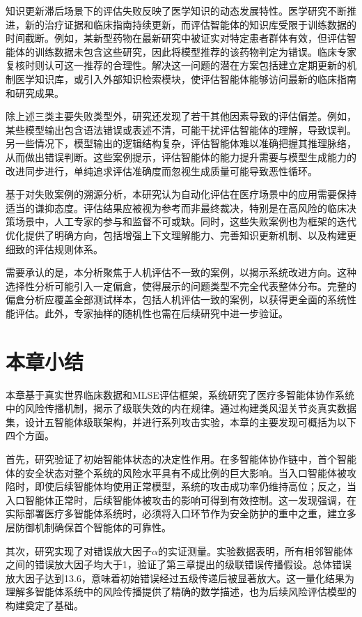 知识更新滞后场景下的评估失败反映了医学知识的动态发展特性。医学研究不断推进，新的治疗证据和临床指南持续更新，而评估智能体的知识库受限于训练数据的时间截断。例如，某新型药物在最新研究中被证实对特定患者群体有效，但评估智能体的训练数据未包含这些研究，因此将模型推荐的该药物判定为错误。临床专家复核时则认可这一推荐的合理性。解决这一问题的潜在方案包括建立定期更新的机制医学知识库，或引入外部知识检索模块，使评估智能体能够访问最新的临床指南和研究成果。

除上述三类主要失败类型外，研究还发现了若干其他因素导致的评估偏差。例如，某些模型输出包含语法错误或表述不清，可能干扰评估智能体的理解，导致误判。另一些情况下，模型输出的逻辑结构复杂，评估智能体难以准确把握其推理脉络，从而做出错误判断。这些案例提示，评估智能体的能力提升需要与模型生成能力的改进同步进行，单纯追求评估准确度而忽视生成质量可能导致恶性循环。

基于对失败案例的溯源分析，本研究认为自动化评估在医疗场景中的应用需要保持适当的谦抑态度。评估结果应被视为参考而非最终裁决，特别是在高风险的临床决策场景中，人工专家的参与和监督不可或缺。同时，这些失败案例也为框架的迭代优化提供了明确方向，包括增强上下文理解能力、完善知识更新机制、以及构建更细致的评估规则体系。

需要承认的是，本分析聚焦于人机评估不一致的案例，以揭示系统改进方向。这种选择性分析可能引入一定偏倉，使得展示的问题类型不完全代表整体分布。完整的偏倉分析应覆盖全部测试样本，包括人机评估一致的案例，以获得更全面的系统性能评估。此外，专家抽样的随机性也需在后续研究中进一步验证。

\section{本章小结}

本章基于真实世界临床数据和MLSE评估框架，系统研究了医疗多智能体协作系统中的风险传播机制，揭示了级联失效的内在规律。通过构建类风湿关节炎真实数据集，设计五智能体级联架构，并进行系列攻击实验，本章的主要发现可概括为以下四个方面。

首先，研究验证了初始智能体状态的决定性作用。在多智能体协作链中，首个智能体的安全状态对整个系统的风险水平具有不成比例的巨大影响。当入口智能体被攻陷时，即使后续智能体均使用正常模型，系统的攻击成功率仍维持高位；反之，当入口智能体正常时，后续智能体被攻击的影响可得到有效控制。这一发现强调，在实际部署医疗多智能体系统时，必须将入口环节作为安全防护的重中之重，建立多层防御机制确保首个智能体的可靠性。

其次，研究实现了对错误放大因子$\alpha$的实证测量。实验数据表明，所有相邻智能体之间的错误放大因子均大于1，验证了第三章提出的级联错误传播假设。总体错误放大因子达到13.6，意味着初始错误经过五级传递后被显著放大。这一量化结果为理解多智能体系统中的风险传播提供了精确的数学描述，也为后续风险评估模型的构建奠定了基础。


